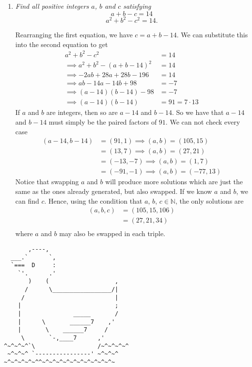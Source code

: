 \documentclass{article}
\begin{document}
\begin{enumerate}[1.]
\item %
{\itshape Find all positive integers $a$, $b$ and $c$ satisfying 
$$a + b - c = 14$$
$$a^2 + b^2 - c^2 = 14.$$}

Rearranging the first equation, we have $c = a + b - 14$. We can substitute this into the second equation to get 
\begin{align*}
  a^2 + b^2 - c^2 &= 14 \\
  \implies a^2 + b^2 - (a + b - 14)^2 &= 14 \\
  \implies -2ab + 28a + 28b - 196 &= 14 \\
  \implies ab - 14a - 14 b + 98 &= -7 \\
  \implies (a - 14)(b - 14) - 98 &= -7 \\
  \implies (a - 14)(b - 14) &= 91 = 7 \cdot 13
\end{align*}
If $a$ and $b$ are integers, then so are $a - 14$ and $b - 14$. So we have that $a - 14$ and $b - 14$ must simply be the paired factors of $91$. We can not check every case 
\begin{align*}
  (a - 14, b - 14) &= (91, 1) \implies (a, b) = (105, 15) \\
  &= (13, 7) \implies (a, b) = (27, 21) \\
  &= (-13, -7) \implies (a, b) = (1, 7) \\
  &= (-91, -1) \implies (a, b) = (-77, 13)
\end{align*}
Notice that swapping $a$ and $b$ will produce more solutions which are just the same as the ones already generated, but also swapped. If we know $a$ and $b$, we can find $c$. Hence, using the condition that $a$, $b$, $c \in \mathbb{N}$, the only solutions are
\begin{align*}
  (a, b, c) &= (105, 15, 106) \\
  &= (27, 21, 34) \\
\end{align*}
where $a$ and $b$ may also be swapped in each triple.

\end{enumerate}

\vfill
\centering
\tiny
\begin{BVerbatim}
       ,----,
  ___.`      `,
  `===  D     :
    `'.      .'
       )    (                   ,
      /      \_________________/|
     /                          |
    |                           ;
    |               _____       /
    |      \       ______7    ,'
    |       \    ______7     /
     \       `-,____7      ,'   
^~^~^~^`\                  /~^~^~^~^
 ~^~^~^ `----------------' ~^~^~^
~^~^~^~^~^^~^~^~^~^~^~^~^~^~^~^~
\end{BVerbatim}
\end{document}

